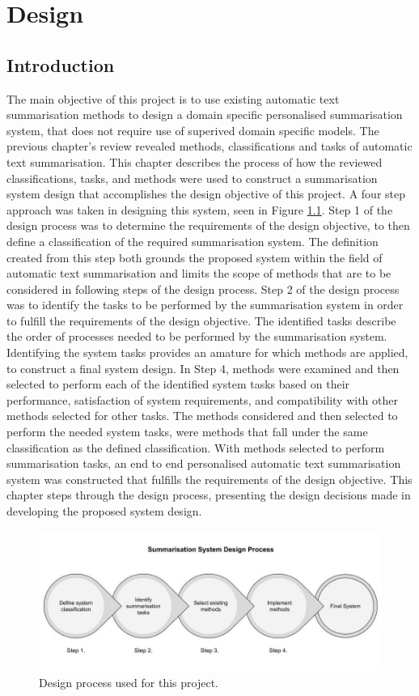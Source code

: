 \chapter{Design}
\label{chp:3}
\section{Introduction}
    The main objective of this project is to use existing automatic text summarisation methods to design a domain specific personalised summarisation system, that does not require use of superived domain specific models. The previous chapter’s review revealed methods, classifications and tasks of automatic text summarisation. This chapter describes the process of how the reviewed classifications, tasks, and methods were used to construct a summarisation system design that accomplishes the design objective of this project. A four step approach was taken in designing this system, seen in Figure \ref{design}. Step 1 of the design process was to determine the requirements of the design objective, to then define a classification of the required summarisation system. The definition created from this step both grounds the proposed system within the field of automatic text summarisation and limits the scope of methods that are to be considered in following steps of the design process. Step 2 of the design process was to identify the tasks to be performed by the summarisation system in order to fulfill the requirements of the design objective. The identified tasks describe the order of processes needed to be performed by the summarisation system. Identifying the system tasks provides an amature for which methods are applied, to construct a final system design. In Step 4, methods were examined and then selected to perform each of the identified system tasks based on their performance, satisfaction of system requirements, and compatibility with other methods selected for other tasks. The methods considered and then selected to perform the needed system tasks, were methods that fall under the same classification as the defined classification. With methods selected to perform summarisation tasks, an end to end personalised automatic text summarisation system was constructed that fulfills the requirements of the design objective. This chapter steps through the design process, presenting the design decisions made in developing the proposed system design.

\begin{figure}
    \centering
         \includegraphics[width=1.0\textwidth]{Figures/Design_Process.jpg}
          \caption{Design process used for this project.}
           \label{design}
\end{figure}


